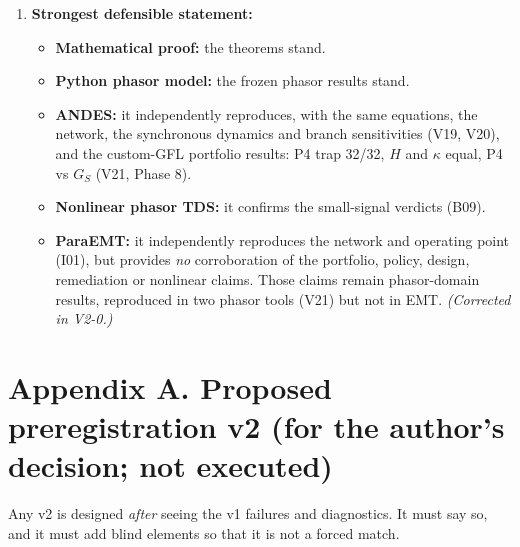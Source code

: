 \documentclass[10pt,a4paper]{article}
\begin{document}
\begin{enumerate}[leftmargin=1.8em]
\begin{itemize}
  \item (ii) The quasi-static network omits the line's $dI/dt$ (about $f/f_0$
    on machine trajectories).
  \item (iii) Upstream ParaEMT ignores transformer ratios, and its IEEE-39
    case is not TX4.
  \end{itemize}
\item \textbf{Strongest defensible statement:}
  \begin{itemize}
  \item \textbf{Mathematical proof:} the theorems stand.
  \item \textbf{Python phasor model:} the frozen phasor results stand.
  \item \textbf{ANDES:} it independently reproduces, with the same
    equations, the network, the synchronous dynamics and branch sensitivities
    (V19, V20), and the custom-GFL portfolio results: P4 trap 32/32, $H$ and
    $\kappa$ equal, P4 vs $G_S$ (V21, Phase 8).
  \item \textbf{Nonlinear phasor TDS:} it confirms the small-signal verdicts
    (B09).
  \item \textbf{ParaEMT:} it independently reproduces the network and
    operating point (I01), but provides \emph{no} corroboration of the
    portfolio, policy, design, remediation or nonlinear claims. Those claims
    remain phasor-domain results, reproduced in two phasor tools (V21) but not
    in EMT. \emph{(Corrected in V2-0.)}
  \end{itemize}
\end{enumerate}

\section*{Appendix A. Proposed preregistration v2 (for the author's decision; not executed)}\label{app:v2}

\noindent{}
\medskip

Any v2 is designed \emph{after} seeing the v1 failures and diagnostics. It must
say so, and it must add blind elements so that it is not a forced match.
\end{document}
